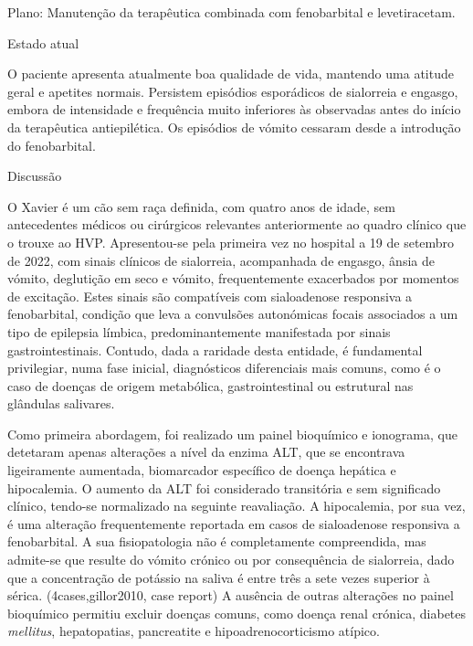Plano: Manutenção da terapêutica combinada com fenobarbital e levetiracetam.


Estado atual 


O paciente apresenta atualmente boa qualidade de vida, mantendo uma atitude geral e apetites normais. Persistem episódios esporádicos de sialorreia e engasgo, embora de intensidade e frequência muito inferiores às observadas antes do início da terapêutica antiepilética. Os episódios de vómito cessaram desde a introdução do fenobarbital.

Discussão


O Xavier é um cão sem raça definida, com quatro anos de idade, sem antecedentes médicos ou cirúrgicos relevantes anteriormente ao quadro clínico que o trouxe ao HVP. Apresentou-se pela primeira vez no hospital a 19 de setembro de 2022, com sinais clínicos de sialorreia, acompanhada de engasgo, ânsia de vómito, deglutição em seco e vómito, frequentemente exacerbados por momentos de excitação. Estes sinais são compatíveis com sialoadenose   responsiva a fenobarbital, condição que leva a convulsões autonómicas focais associados a um tipo de epilepsia límbica, predominantemente manifestada por sinais gastrointestinais. Contudo, dada a raridade desta entidade, é fundamental privilegiar, numa fase inicial, diagnósticos diferenciais mais comuns, como é o caso de doenças de origem metabólica, gastrointestinal ou estrutural nas glândulas salivares.


Como primeira abordagem, foi realizado um painel bioquímico e ionograma, que detetaram apenas alterações a nível da enzima ALT, que se encontrava ligeiramente aumentada, biomarcador específico de doença hepática e hipocalemia. O aumento da ALT foi considerado transitória e sem significado clínico, tendo-se normalizado na seguinte reavaliação. A hipocalemia, por sua vez, é uma alteração frequentemente reportada em casos de sialoadenose responsiva a fenobarbital. A sua fisiopatologia não é completamente compreendida, mas admite-se que resulte do vómito crónico ou por consequência de sialorreia, dado que a concentração de potássio na saliva é entre três a sete vezes superior à sérica. (4cases,gillor2010, case report) A ausência de outras alterações no painel bioquímico permitiu excluir doenças comuns, como doença renal crónica, diabetes \textit{mellitus}, hepatopatias, pancreatite e hipoadrenocorticismo atípico.



